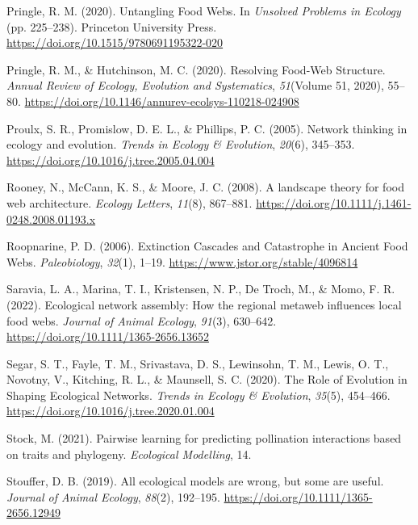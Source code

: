 \documentclass[
]{article}
\newlength{\cslhangindent}
\newenvironment{CSLReferences}[2] %
 {\begin{list}{}{%
  \setlength{\itemindent}{0pt}
  \setlength{\leftmargin}{0pt}
  \setlength{\parsep}{0pt}
  \ifodd #1
   \setlength{\leftmargin}{\cslhangindent}
   \setlength{\itemindent}{-1\cslhangindent}
  \fi
  \setlength{\itemsep}{#2\baselineskip}}}
 {\end{list}}
\begin{document}
\begin{CSLReferences}{1}{0}
Pringle, R. M. (2020). Untangling {Food Webs}. In \emph{Unsolved
{Problems} in {Ecology}} (pp. 225--238). Princeton University Press.
\url{https://doi.org/10.1515/9780691195322-020}

Pringle, R. M., \& Hutchinson, M. C. (2020). Resolving {Food-Web
Structure}. \emph{Annual Review of Ecology, Evolution and Systematics},
\emph{51}(Volume 51, 2020), 55--80.
\url{https://doi.org/10.1146/annurev-ecolsys-110218-024908}

Proulx, S. R., Promislow, D. E. L., \& Phillips, P. C. (2005). Network
thinking in ecology and evolution. \emph{Trends in Ecology \&
Evolution}, \emph{20}(6), 345--353.
\url{https://doi.org/10.1016/j.tree.2005.04.004}

Rooney, N., McCann, K. S., \& Moore, J. C. (2008). A landscape theory
for food web architecture. \emph{Ecology Letters}, \emph{11}(8),
867--881. \url{https://doi.org/10.1111/j.1461-0248.2008.01193.x}

Roopnarine, P. D. (2006). Extinction {Cascades} and {Catastrophe} in
{Ancient Food Webs}. \emph{Paleobiology}, \emph{32}(1), 1--19.
\url{https://www.jstor.org/stable/4096814}

Saravia, L. A., Marina, T. I., Kristensen, N. P., De Troch, M., \& Momo,
F. R. (2022). Ecological network assembly: {How} the regional metaweb
influences local food webs. \emph{Journal of Animal Ecology},
\emph{91}(3), 630--642. \url{https://doi.org/10.1111/1365-2656.13652}

Segar, S. T., Fayle, T. M., Srivastava, D. S., Lewinsohn, T. M., Lewis,
O. T., Novotny, V., Kitching, R. L., \& Maunsell, S. C. (2020). The
{Role} of {Evolution} in {Shaping Ecological Networks}. \emph{Trends in
Ecology \& Evolution}, \emph{35}(5), 454--466.
\url{https://doi.org/10.1016/j.tree.2020.01.004}

Stock, M. (2021). Pairwise learning for predicting pollination
interactions based on traits and phylogeny. \emph{Ecological Modelling},
14.

Stouffer, D. B. (2019). All ecological models are wrong, but some are
useful. \emph{Journal of Animal Ecology}, \emph{88}(2), 192--195.
\url{https://doi.org/10.1111/1365-2656.12949}


\end{CSLReferences}
\end{document}
